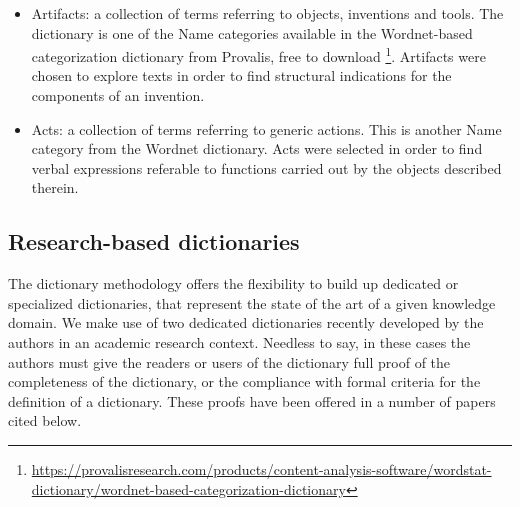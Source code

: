 \documentclass[]{book}
\let\rmarkdownfootnote\footnote%
\def\footnote{\protect\rmarkdownfootnote}
\begin{document}
\begin{itemize}
\item
  Artifacts: a collection of terms referring to objects, inventions and
  tools. The dictionary is one of the Name categories available in the
  Wordnet-based categorization dictionary from Provalis, free to
  download \footnote{\url{https://provalisresearch.com/products/content-analysis-software/wordstat-dictionary/wordnet-based-categorization-dictionary}}.
  Artifacts were chosen to explore texts in order to find structural
  indications for the components of an invention.
\item
  Acts: a collection of terms referring to generic actions. This is
  another Name category from the Wordnet dictionary. Acts were selected
  in order to find verbal expressions referable to functions carried out
  by the objects described therein.
\end{itemize}

\subsection{Research-based
dictionaries}\label{research-based-dictionaries}

The dictionary methodology offers the flexibility to build up dedicated
or specialized dictionaries, that represent the state of the art of a
given knowledge domain. We make use of two dedicated dictionaries
recently developed by the authors in an academic research context.
Needless to say, in these cases the authors must give the readers or
users of the dictionary full proof of the completeness of the
dictionary, or the compliance with formal criteria for the definition of
a dictionary. These proofs have been offered in a number of papers cited
below.
\end{document}
